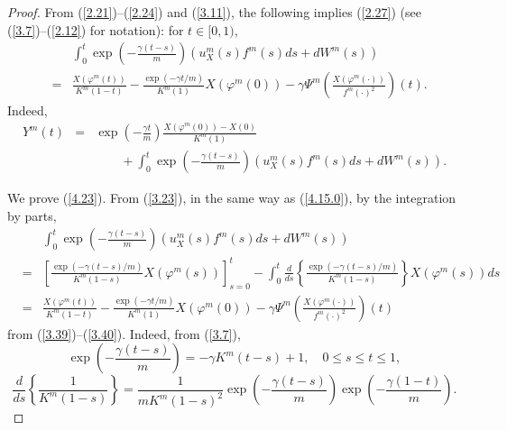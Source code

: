 \documentclass[10pt,a4paper]{amsart}
\begin{document}
\begin{proof}
From (\ref{2.21})--(\ref{2.24}) and (\ref{3.11}), the following implies (\ref{2.27}) (see (\ref{3.7})--(\ref{2.12})
for notation): for $t\in [0,1)$,
\begin{eqnarray}
&&\int_{0}^{t}\exp\left(-\frac{\gamma (t-s)}{m}\right)(u_X^m(s)f^m(s)ds +d W^m(s))\label{4.23}\\
 &=&\frac{X(\varphi^m(t))}{K^m(1-t)}-\frac{\exp(-\gamma t/m)}{K^m(1)}X(\varphi^m(0))
-\gamma\Psi^m\left(\frac{X(\varphi^m (\cdot))}{f^m(\cdot)^2}\right)(t).\nonumber
\end{eqnarray}
Indeed,
\begin{eqnarray}
Y^m(t)&=&\exp\left(-\frac{\gamma t}{m}\right)\frac{X(\varphi^m(0))-X(0)}{K^m(1)}\label{4.19}\\
&&\qquad +\int_{0}^{t} \exp\left(-\frac{\gamma (t-s)}{m}\right)(u_X^m(s)f^m(s)ds +d W^m(s)).\nonumber
\end{eqnarray}

We prove (\ref{4.23}).
From   (\ref{3.23}), in the same way as (\ref{4.15.0}), by the integration by parts,
\begin{eqnarray}
&&\int_{0}^{t}\exp\left(-\frac{\gamma (t-s)}{m}\right)(u_X^m(s)f^m(s)ds +d W^m(s))\\%
&=&\left[\frac{\exp(-\gamma (t-s)/m)}{K^m(1-s)}X(\varphi^m(s))\right]_{s=0}^t
 -\int_{0}^{t} \frac{d}{ds}\left\{\frac{\exp(-\gamma (t-s)/m)}{K^m(1-s)}\right\}X(\varphi^m(s))ds \nonumber\\
 &=&\frac{X(\varphi^m(t))}{K^m(1-t)}-\frac{\exp(-\gamma t/m)}{K^m(1)}X(\varphi^m(0))
-\gamma\Psi^m\left(\frac{X(\varphi^m (\cdot))}{f^m(\cdot)^2}\right)(t)\nonumber
\end{eqnarray}
from (\ref{3.39})--(\ref{3.40}).
Indeed, from (\ref{3.7}),
$$\exp\left(-\frac{\gamma (t-s)}{m}\right)=-\gamma K^m(t-s)+1,\quad 0\le s\le t\le 1,$$
$$\frac{d}{ds}\left\{\frac{1}{K^m(1-s)}\right\}=\frac{1}{mK^m(1-s)^2}
\exp\left(-\frac{\gamma (t-s)}{m}\right)\exp\left(-\frac{\gamma (1-t)}{m}\right).
$$

\end{proof}
\end{document}
